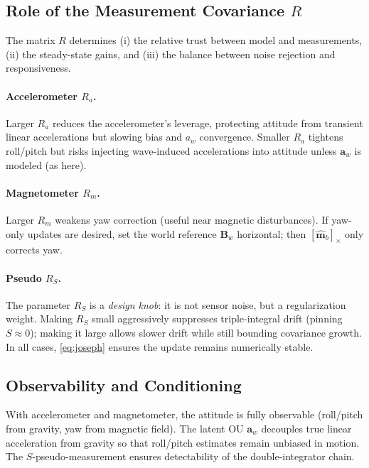 \documentclass[10pt]{extarticle}
\begin{document}
\subsection{Role of the Measurement Covariance $R$}
The matrix $R$ determines (i) the relative trust between model and measurements,
(ii) the steady-state gains, and (iii) the balance between noise rejection and responsiveness.

\paragraph{Accelerometer $R_a$.}
Larger $R_a$ reduces the accelerometer’s leverage, protecting attitude from transient linear accelerations
but slowing bias and $a_w$ convergence. Smaller $R_a$ tightens roll/pitch but risks injecting wave-induced
accelerations into attitude unless $\bm a_w$ is modeled (as here).

\paragraph{Magnetometer $R_m$.}
Larger $R_m$ weakens yaw correction (useful near magnetic disturbances). If yaw-only updates are desired,
set the world reference \(\bm B_w\) horizontal; then \([\hat{\bm m}_b]_\times\) only corrects yaw.

\paragraph{Pseudo $R_S$.}
The parameter $R_S$ is a \emph{design knob}: it is not sensor noise, but a regularization weight. 
Making $R_S$ small aggressively suppresses triple-integral drift (pinning $S\!\approx\!0$); making it large
allows slower drift while still bounding covariance growth. In all cases, \eqref{eq:joseph} ensures the update
remains numerically stable.

\subsection{Observability and Conditioning}
With accelerometer and magnetometer, the attitude is fully observable (roll/pitch from gravity, yaw from magnetic field).
The latent OU \(\bm a_w\) decouples true linear acceleration from gravity so that roll/pitch estimates remain unbiased in motion.
The $S$-pseudo-measurement ensures detectability of the double-integrator chain.
\end{document}
